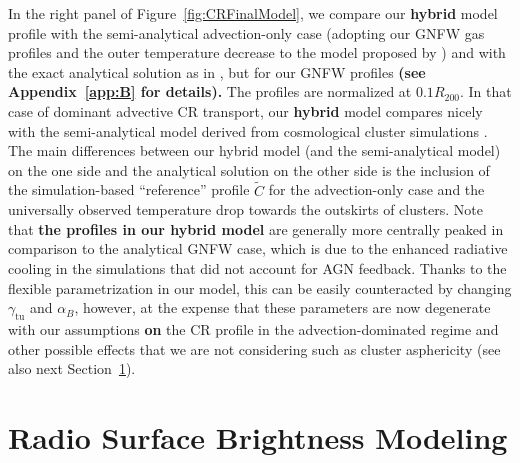 \documentclass[traditabstract]{aa}
\def\C#1{{\bf #1}}
\newcommand{\rmn}{\mathrm}
\begin{document}
In the right panel of Figure~\ref{fig:CRFinalModel}, we compare our \C{hybrid}
model profile with the semi-analytical advection-only case (adopting our GNFW
gas profiles and the outer temperature decrease to the model proposed by
\citealp{2010MNRAS.409..449P}) and with the exact analytical solution as in
\citet{2011A&A...527A..99E}, but for our GNFW profiles \C{(see Appendix~\ref{app:B} for details).}  
The profiles are normalized at $0.1 R_{200}$. In that case of dominant advective CR
transport, our \C{hybrid} model compares nicely with the semi-analytical model
derived from cosmological cluster simulations \citep{2010MNRAS.409..449P}.  The
main differences between our hybrid model (and the semi-analytical model) on the
one side and the analytical solution on the other side is the inclusion of the
simulation-based ``reference'' profile $\tilde{C}$ for the advection-only case
and the universally observed temperature drop towards the outskirts of
clusters. Note that \C{the profiles in our hybrid model} are generally more centrally peaked
in comparison to the analytical GNFW case, which is due to the enhanced
radiative cooling in the \citet{2010MNRAS.409..449P} simulations that did not
account for AGN feedback. Thanks to the flexible parametrization in our model,
this can be easily counteracted by changing $\gamma_{\rmn{tu}}$ and $\alpha_B$,
however, at the expense that these parameters are now degenerate with our
assumptions \C{on} the CR profile in the advection-dominated regime and other
possible effects that we are not considering such as cluster asphericity
(see also next Section~\ref{sec:3}).


\section{Radio Surface Brightness Modeling}
\label{sec:3}
\end{document}
